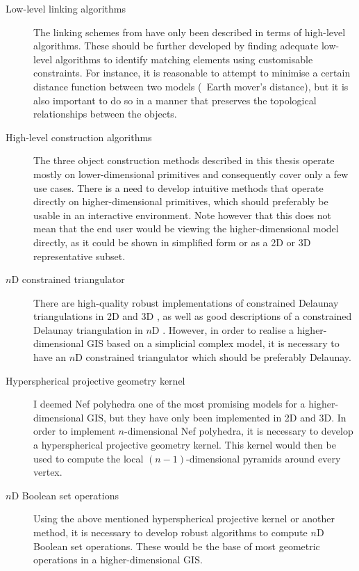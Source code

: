 \begin{description}

\item[Low-level linking algorithms] The linking schemes from  have only been described in terms of high-level algorithms.
These should be further developed by finding adequate low-level algorithms to identify matching elements using customisable constraints.
For instance, it is reasonable to attempt to minimise a certain distance function between two models (\eg\ Earth mover's distance), but it is also important to do so in a manner that preserves the topological relationships between the objects.

\item[High-level construction algorithms] The three object construction methods described in this thesis operate mostly on lower-dimensional primitives and consequently cover only a few use cases.
There is a need to develop intuitive methods that operate directly on higher-dimensional primitives, which should preferably be usable in an interactive environment.
Note however that this does not mean that the end user would be viewing the higher-dimensional model directly, as it could be shown in simplified form or as a 2D or 3D representative subset.

\item[$n$D constrained triangulator] There are high-quality robust implementations of constrained Delaunay triangulations in 2D \citep{Shewchuk96} and 3D \citep{Si05}, as well as good descriptions of a constrained Delaunay triangulation in $n$D \citep{Shewchuk07}.
However, in order to realise a higher-dimensional GIS based on a simplicial complex model, it is necessary to have an $n$D constrained triangulator which should be preferably Delaunay.

\item[Hyperspherical projective geometry kernel] I deemed Nef polyhedra one of the most promising models for a higher-dimensional GIS, but they have only been implemented in 2D and 3D.\@
In order to implement $n$-dimensional Nef polyhedra, it is necessary to develop a hyperspherical projective geometry kernel.
This kernel would then be used to compute the local $(n-1)$-dimensional pyramids around every vertex.

\item[$n$D Boolean set operations] Using the above mentioned hyperspherical projective kernel or another method, it is necessary to develop robust algorithms to compute $n$D Boolean set operations.
These would be the base of most geometric operations in a higher-dimensional GIS.\@


\end{description}
